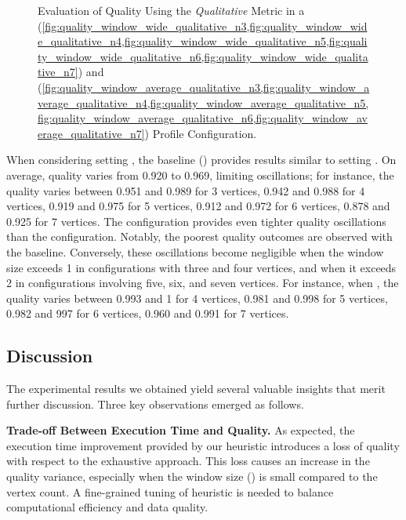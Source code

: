 \begin{figure}[H]
\begin{adjustbox}{minipage=\linewidth,scale=0.75}
    \caption{Evaluation of Quality Using the \emph{Qualitative} Metric in a \wide (\cref{fig:quality_window_wide_qualitative_n3,fig:quality_window_wide_qualitative_n4,fig:quality_window_wide_qualitative_n5,fig:quality_window_wide_qualitative_n6,fig:quality_window_wide_qualitative_n7}) and \average (\cref{fig:quality_window_average_qualitative_n3,fig:quality_window_average_qualitative_n4,fig:quality_window_average_qualitative_n5,fig:quality_window_average_qualitative_n6,fig:quality_window_average_qualitative_n7}) Profile Configuration.}  \label{fig:quality_window_qualitative}
  \end{adjustbox}
\end{figure}

When considering setting \average, the baseline () provides results similar to setting \wide. On average, quality varies from 0.920 to 0.969, limiting oscillations; for instance, the quality varies between 0.951 and 0.989 for 3 vertices, 0.942 and 0.988 for 4 vertices, 0.919 and 0.975 for 5 vertices, 0.912 and 0.972 for 6 vertices, 0.878 and 0.925 for 7 vertices. The \average configuration provides even tighter quality oscillations than the \wide configuration. Notably, the poorest quality outcomes are observed with the baseline. Conversely, these oscillations become negligible when the window size exceeds 1 in configurations with three and four vertices, and when it exceeds 2 in configurations involving five, six, and seven vertices.  For instance, when , the quality varies between  0.993 and 1 for 4 vertices, 0.981 and 0.998 for 5 vertices, 0.982 and 997 for 6 vertices, 0.960 and 0.991 for 7 vertices.


\subsection{Discussion}
The experimental results we obtained yield several valuable insights that merit further discussion. Three key observations emerged as follows.

\vspace{0.5em}

\noindent\textbf{Trade-off Between Execution Time and Quality.} As expected, the execution time improvement provided by our heuristic introduces a loss of quality with respect to the exhaustive approach. This loss causes an increase in the quality variance, especially when the window size (\windowsize) is small compared to the vertex count. A fine-grained tuning of heuristic is needed to balance computational efficiency and data quality.

